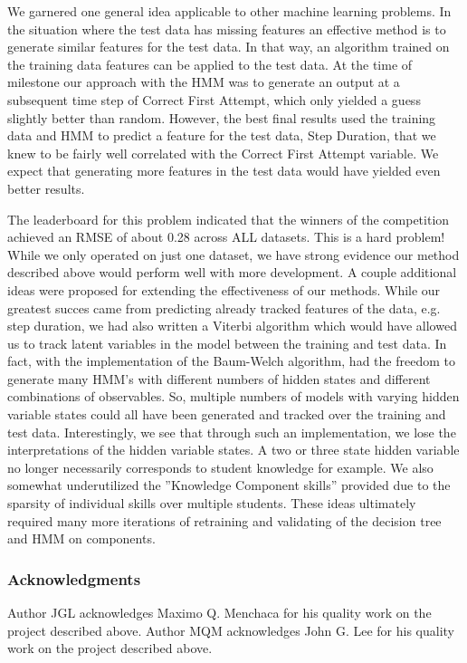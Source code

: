 \documentclass{article} %
\begin{document}
We garnered one general idea applicable to other machine learning problems. In the situation where the test data has missing features an effective method is to generate similar features for the test data. In that way, an algorithm trained on the training data features can be applied to the test data. At the time of milestone our approach with the HMM was to generate an output at a subsequent time step of Correct First Attempt, which only yielded a guess slightly better than random. However, the best final results used the training data and HMM to predict a feature for the test data, Step Duration, that we knew to be fairly well correlated with the Correct First Attempt variable. We expect that generating more features in the test data would have yielded even better results.

The leaderboard for this problem indicated that the winners of the competition achieved an RMSE of about 0.28 across ALL datasets. This is a hard problem! While we only operated on just one dataset, we have strong evidence our method described above would perform well with more development. A couple additional ideas were proposed for extending the effectiveness of our methods. While our greatest succes came from predicting already tracked features of the data, e.g. step duration, we had also written a Viterbi algorithm which would have allowed us to track latent variables in the model between the training and test data. In fact, with the implementation of the Baum-Welch algorithm, had the freedom to generate many HMM's with different numbers of hidden states and  different combinations of observables. So, multiple numbers of models with varying hidden variable states could all have been generated and tracked over the training and test data. Interestingly, we see that through such an implementation, we lose the interpretations of the hidden variable states. A two or three state hidden variable no longer necessarily corresponds to student knowledge for example. We also somewhat underutilized the ''Knowledge Component skills'' provided due to the sparsity of individual skills over multiple students. These ideas ultimately required many more iterations of retraining and validating of the decision tree and HMM on components.


\subsubsection*{Acknowledgments}

Author JGL acknowledges Maximo Q. Menchaca for his quality work on the project described above. Author MQM acknowledges John G. Lee for his quality work on the project described above.
\end{document}
